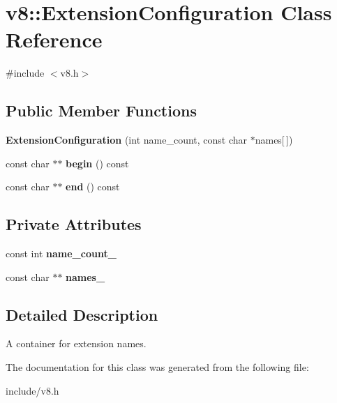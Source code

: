 \hypertarget{classv8_1_1_extension_configuration}{}\section{v8\+:\+:Extension\+Configuration Class Reference}
\label{classv8_1_1_extension_configuration}


{\ttfamily \#include $<$v8.\+h$>$}

\subsection*{Public Member Functions}
\begin{DoxyCompactItemize}
\item 
{\bfseries Extension\+Configuration} (int name\+\_\+count, const char $\ast$names\mbox{[}$\,$\mbox{]})\hypertarget{classv8_1_1_extension_configuration_a1189e46efe963db4aa7340cc767f276a}{}\label{classv8_1_1_extension_configuration_a1189e46efe963db4aa7340cc767f276a}

\item 
const char $\ast$$\ast$ {\bfseries begin} () const \hypertarget{classv8_1_1_extension_configuration_ae776fbc067a257bac854d9bcc9b72141}{}\label{classv8_1_1_extension_configuration_ae776fbc067a257bac854d9bcc9b72141}

\item 
const char $\ast$$\ast$ {\bfseries end} () const \hypertarget{classv8_1_1_extension_configuration_abcbebcc4782016f58fc60de82f59f61a}{}\label{classv8_1_1_extension_configuration_abcbebcc4782016f58fc60de82f59f61a}

\end{DoxyCompactItemize}
\subsection*{Private Attributes}
\begin{DoxyCompactItemize}
\item 
const int {\bfseries name\+\_\+count\+\_\+}\hypertarget{classv8_1_1_extension_configuration_a5cc34723570b88ea2bf3b00fae81d3cb}{}\label{classv8_1_1_extension_configuration_a5cc34723570b88ea2bf3b00fae81d3cb}

\item 
const char $\ast$$\ast$ {\bfseries names\+\_\+}\hypertarget{classv8_1_1_extension_configuration_a866e52fd6511b7dc86a0861dca114c90}{}\label{classv8_1_1_extension_configuration_a866e52fd6511b7dc86a0861dca114c90}

\end{DoxyCompactItemize}


\subsection{Detailed Description}
A container for extension names. 

The documentation for this class was generated from the following file\+:\begin{DoxyCompactItemize}
\item 
include/v8.\+h\end{DoxyCompactItemize}
